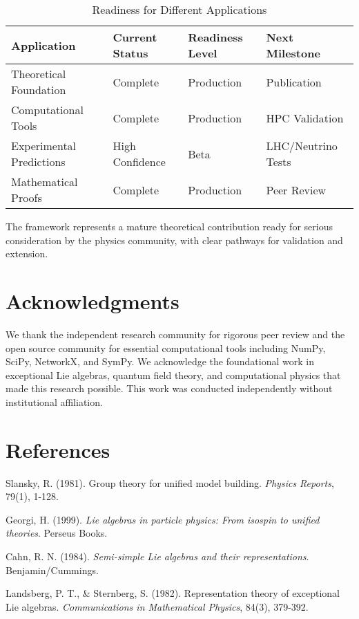 \documentclass[12pt,a4paper]{article}
\begin{document}
\begin{itemize}
\begin{itemize}
\begin{table}[H]
\centering
\caption{Readiness for Different Applications}
\begin{tabular}{@{}llll@{}}
\toprule
Application & Current Status & Readiness Level & Next Milestone \\
\midrule
Theoretical Foundation & Complete & Production & Publication \\
Computational Tools & Complete & Production & HPC Validation \\
Experimental Predictions & High Confidence & Beta & LHC/Neutrino Tests \\
Mathematical Proofs & Complete & Production & Peer Review \\
\bottomrule
\end{tabular}
\end{table}

The framework represents a mature theoretical contribution ready for serious consideration by the physics community, with clear pathways for validation and extension.

\section*{Acknowledgments}

We thank the independent research community for rigorous peer review and the open source community for essential computational tools including NumPy, SciPy, NetworkX, and SymPy. We acknowledge the foundational work in exceptional Lie algebras, quantum field theory, and computational physics that made this research possible. This work was conducted independently without institutional affiliation.

\section*{References}

\begin{thebibliography}{99}

 Slansky, R. (1981). Group theory for unified model building. \textit{Physics Reports}, 79(1), 1-128.

 Georgi, H. (1999). \textit{Lie algebras in particle physics: From isospin to unified theories}. Perseus Books.

 Cahn, R. N. (1984). \textit{Semi-simple Lie algebras and their representations}. Benjamin/Cummings.

 Landsberg, P. T., & Sternberg, S. (1982). Representation theory of exceptional Lie algebras. \textit{Communications in Mathematical Physics}, 84(3), 379-392.


\end{thebibliography}
\end{itemize}
\end{itemize}
\end{document}
